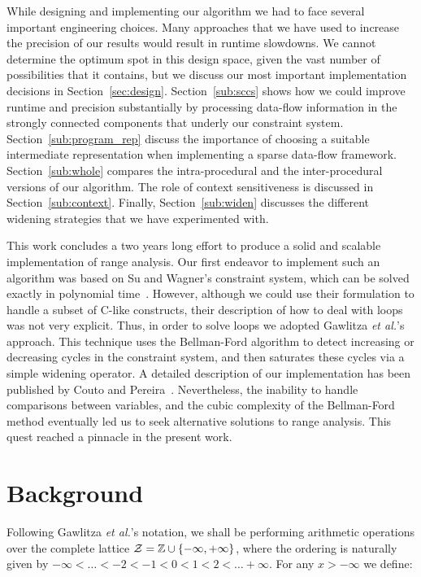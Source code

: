 \documentclass[times]{speauth}
\begin{document}
While designing and implementing our algorithm we had to face several important
engineering choices.
Many approaches that we have used to increase the precision of
our results would result in runtime slowdowns.
We cannot determine the optimum spot in this design space, given the
vast number of possibilities that it contains, but we discuss our most important
implementation decisions in Section~\ref{sec:design}.
Section~\ref{sub:sccs} shows how we could improve runtime and precision
substantially by processing data-flow information in the strongly connected
components that underly our constraint system.
Section~\ref{sub:program_rep} discuss the importance of choosing a suitable
intermediate representation when implementing a sparse data-flow framework.
Section~\ref{sub:whole} compares the intra-procedural and the inter-procedural
versions of our algorithm.
The role of context sensitiveness is discussed in Section~\ref{sub:context}.
Finally, Section~\ref{sub:widen} discusses the different widening strategies
that we have experimented with.

This work concludes a two years long effort to produce a solid and scalable
implementation of range analysis.
Our first endeavor to implement such an algorithm was based on Su and
Wagner's constraint system, which can be solved exactly in polynomial
time~\cite{Su04,Su05}.
However, although we could use their formulation to handle a subset of C-like
constructs, their description of how to deal with loops was not very explicit.
Thus, in order to solve loops we adopted Gawlitza
{\em et al.}'s~\cite{Gawlitza09} approach.
This technique uses the Bellman-Ford algorithm to detect increasing or
decreasing cycles in the constraint system, and then saturates these cycles
via a simple widening operator.
A detailed description of our implementation has been published by
Couto and Pereira~\cite{Couto11}.
Nevertheless, the inability to handle comparisons between variables, and the
cubic complexity of the Bellman-Ford method eventually led us to seek
alternative solutions to range analysis.
This quest reached a pinnacle in the present work.

\section{Background}
\label{sec:bck}

Following Gawlitza {\em et al.}'s notation, we shall be performing arithmetic
operations over the complete lattice
$\cal{Z} = \mathbb{Z} \cup \{-\infty, +\infty\}$, where the ordering is
naturally given by $-\infty < \ldots < -2 < -1 < 0 < 1 < 2 < \ldots +\infty$.
For any $x > -\infty$ we define:
\end{document}
